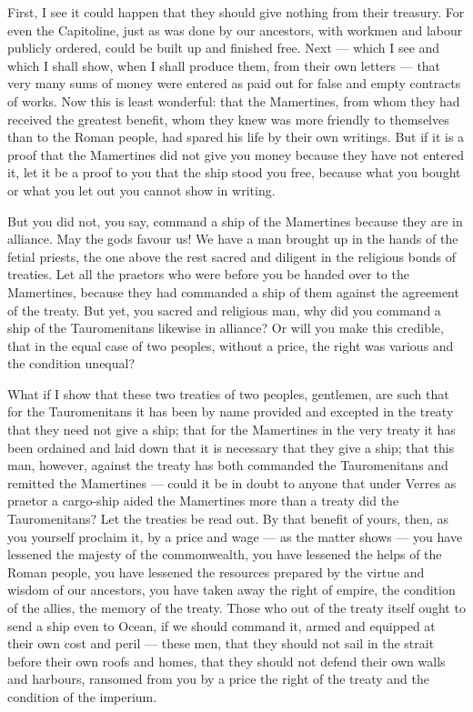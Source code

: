  First, I see it could happen that they should give nothing from their treasury. For even the Capitoline, just as was done by our ancestors, with workmen and labour publicly ordered, could be built up and finished free. Next --- which I see and which I shall show, when I shall produce them, from their own letters --- that very many sums of money were entered as paid out for false and empty contracts of works. Now this is least wonderful: that the Mamertines, from whom they had received the greatest benefit, whom they knew was more friendly to themselves than to the Roman people, had spared his life by their own writings. But if it is a proof that the Mamertines did not give you money because they have not entered it, let it be a proof to you that the ship stood you free, because what you bought or what you let out you cannot show in writing.

 But you did not, you say, command a ship of the Mamertines because they are in alliance. May the gods favour us! We have a man brought up in the hands of the fetial priests, the one above the rest sacred and diligent in the religious bonds of treaties. Let all the praetors who were before you be handed over to the Mamertines, because they had commanded a ship of them against the agreement of the treaty. But yet, you sacred and religious man, why did you command a ship of the Tauromenitans likewise in alliance? Or will you make this credible, that in the equal case of two peoples, without a price, the right was various and the condition unequal?

 What if I show that these two treaties of two peoples, gentlemen, are such that for the Tauromenitans it has been by name provided and excepted in the treaty that they need not give a ship; that for the Mamertines in the very treaty it has been ordained and laid down that it is necessary that they give a ship; that this man, however, against the treaty has both commanded the Tauromenitans and remitted the Mamertines --- could it be in doubt to anyone that under Verres as praetor a cargo-ship aided the Mamertines more than a treaty did the Tauromenitans? Let the treaties be read out. By that benefit of yours, then, as you yourself proclaim it, by a price and wage --- as the matter shows --- you have lessened the majesty of the commonwealth, you have lessened the helps of the Roman people, you have lessened the resources prepared by the virtue and wisdom of our ancestors, you have taken away the right of empire, the condition of the allies, the memory of the treaty. Those who out of the treaty itself ought to send a ship even to Ocean, if we should command it, armed and equipped at their own cost and peril --- these men, that they should not sail in the strait before their own roofs and homes, that they should not defend their own walls and harbours, ransomed from you by a price the right of the treaty and the condition of the imperium.

